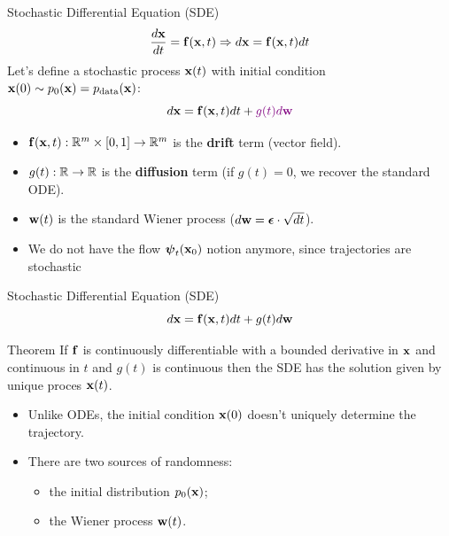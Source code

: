 \documentclass{beamer}
\begin{document}
\begin{frame}{Stochastic Differential Equation (SDE)}
	\[
 		\frac{d \mathbf{x}}{dt} = \mathbf{f}(\mathbf{x}, t) \Rightarrow d\mathbf{x} = \mathbf{f}(\mathbf{x}, t) dt
	\]
	\eqpause
	Let's define a stochastic process $\mathbf{x}(t)$ with initial condition $\mathbf{x}(0) \sim p_0(\mathbf{x}) = p_{\text{data}}(\mathbf{x})$:
	\[
		d\mathbf{x} = \mathbf{f}(\mathbf{x}, t) dt + {\color{violet}g(t) d \mathbf{w}}
	\]
	\eqpause
	\vspace{-0.5cm}
	\begin{itemize}
		 \item $\mathbf{f}(\mathbf{x}, t): \mathbb{R}^m \times [0, 1] \rightarrow \mathbb{R}^m$ is the \textbf{drift} term (vector field).
		 \item $g(t): \mathbb{R} \rightarrow \mathbb{R}$ is the \textbf{diffusion} term (if $g(t)=0$, we recover the standard ODE).
		 \item $\mathbf{w}(t)$ is the standard Wiener process ($d\mathbf{w} = \boldsymbol{\epsilon} \cdot \sqrt{dt}$).
		 \item We do not have the flow $\boldsymbol{\psi}_t(\mathbf{x}_0)$ notion anymore, since trajectories are stochastic
	\end{itemize}
\end{frame}
\begin{frame}{Stochastic Differential Equation (SDE)}
	\[
		d\mathbf{x} = \mathbf{f}(\mathbf{x}, t) dt + g(t) d \mathbf{w}
	\]
	\begin{block}{Theorem}
		If $\mathbf{f}$ is continuously differentiable with a bounded derivative in $\mathbf{x}$ and continuous in $t$ and $g(t)$ is continuous then the SDE has the solution given by unique proces $\mathbf{x}(t)$.
	\end{block}

	\begin{itemize}
		\item Unlike ODEs, the initial condition $\mathbf{x}(0)$ doesn't uniquely determine the trajectory.
		\item There are two sources of randomness: 
		\begin{itemize}
			\item the initial distribution $p_0(\mathbf{x})$;
			\item the Wiener process $\mathbf{w}(t)$.
		\end{itemize}
	\end{itemize}
\end{frame}
\end{document}

